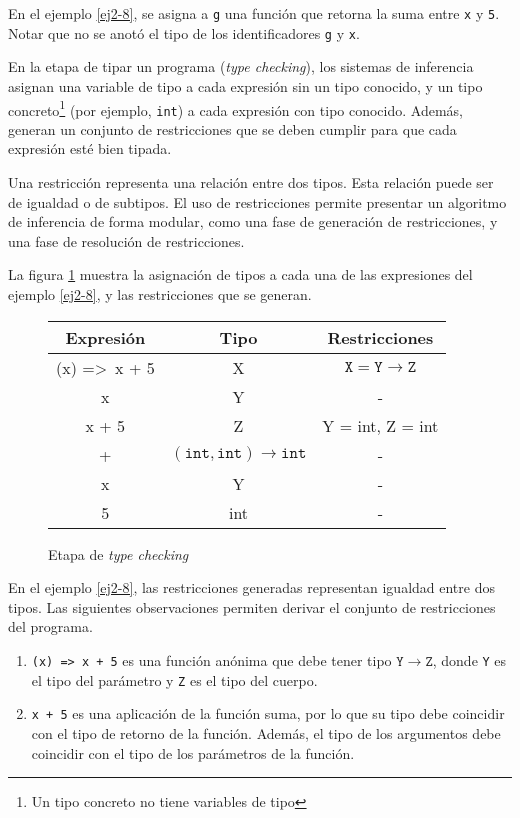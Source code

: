 En el ejemplo \ref{ej2-8}, se asigna a \texttt{g} una función que retorna la suma entre \texttt{x} y \texttt{5}. Notar que no se anotó el tipo de los identificadores \texttt{g} y \texttt{x}.

En la etapa de tipar un programa (\emph{type checking}), los sistemas de inferencia asignan una variable de tipo a cada expresión sin un tipo conocido, y un tipo concreto\footnote{Un tipo concreto no tiene variables de tipo} (por ejemplo, \texttt{int}) a cada expresión con tipo conocido. Además, generan un conjunto de restricciones que se deben cumplir para que cada expresión esté bien tipada.
\clearpage

Una restricción representa una relación entre dos tipos. Esta relación puede ser de igualdad o de subtipos. El uso de restricciones permite presentar un algoritmo de inferencia de forma modular, como una fase de generación de restricciones, y una fase de resolución de restricciones.

La figura \ref{tabla1} muestra la asignación de tipos a cada una de las expresiones del ejemplo \ref{ej2-8}, y las restricciones que se generan.


\begin{figure}[ht]
  \centering
  \ttfamily
  \begin{tabular}{c c c}
    Expresión & Tipo & Restricciones\\
    \hline
    (x) =>\ x + 5 & X & $\mathtt{X = Y \rightarrow Z}$\\
    x & Y & -\\
    x + 5 & Z & Y = int, Z = int\\
    + & $\mathtt{(int,int) \rightarrow int}$ & -\\
    x & Y & -\\
    5 & int & -\\
  \end{tabular}
  \caption{Etapa de \emph{type checking}}
  \label{tabla1}
\end{figure}

En el ejemplo \ref{ej2-8}, las restricciones generadas representan igualdad entre dos tipos. Las siguientes observaciones permiten derivar el conjunto de restricciones del programa.

\begin{enumerate}
  \item \texttt{(x) =>\ x + 5} es una función anónima que debe tener tipo $\mathtt{Y \rightarrow Z}$, donde \texttt{Y} es el tipo del parámetro y \texttt{Z} es el tipo del cuerpo.
  \item \texttt{x + 5} es una aplicación de la función suma, por lo que su tipo debe coincidir con el tipo de retorno de la función. Además, el tipo de los argumentos debe coincidir con el tipo de los parámetros de la función.
\end{enumerate}

